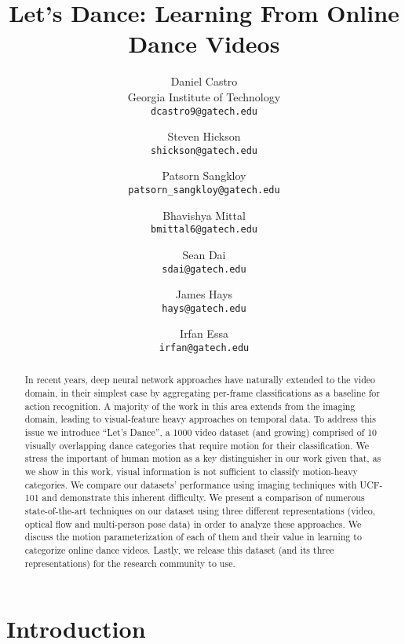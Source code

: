 \documentclass[10pt,twocolumn,letterpaper]{article}
\begin{document}
\title{Let's Dance: Learning From Online Dance Videos}
\author{Daniel Castro\\
Georgia Institute of Technology\\
{\tt\small dcastro9@gatech.edu}
\and
Steven Hickson\\
{\tt\small shickson@gatech.edu}
\and
Patsorn Sangkloy\\
{\tt\small patsorn\_sangkloy@gatech.edu}
\and
Bhavishya Mittal\\
{\tt\small bmittal6@gatech.edu}
\and
Sean Dai\\
{\tt\small sdai@gatech.edu}
\and
James Hays\\
{\tt\small hays@gatech.edu}
\and
Irfan Essa\\
{\tt\small irfan@gatech.edu}
}

\maketitle

\begin{abstract}
In recent years, deep neural network approaches have naturally extended to the video domain, in their simplest case by aggregating per-frame classifications as a baseline for action recognition. A majority of the work in this area extends from the imaging domain, leading to visual-feature heavy approaches on temporal data. To address this issue we introduce ``Let's Dance'', a 1000 video dataset (and growing) comprised of 10 visually overlapping dance categories that require motion for their classification. We stress the important of human motion as a key distinguisher in our work given that, as we show in this work, visual information is not sufficient to classify motion-heavy categories. We compare our datasets' performance using imaging techniques with UCF-101 and demonstrate this inherent difficulty.  We present a comparison of numerous state-of-the-art techniques on our dataset using three different representations (video, optical flow and multi-person pose data) in order to analyze these approaches. We discuss the motion parameterization of each of them and their value in learning to categorize online dance videos. Lastly, we release this dataset (and its three representations) for the research community to use.
\end{abstract}

\section{\label{sec:intro}Introduction}
\end{document}
